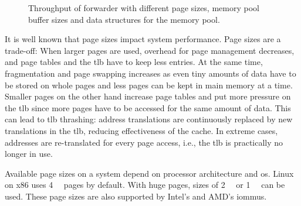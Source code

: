 \begin{figure}[!b]
    \centering
    \par
    \par

    \caption{Throughput of forwarder with different page sizes, memory pool
    buffer sizes and data structures for the memory pool.}
    \label{fig:page-size-throughput}
\end{figure}

It is well known that page sizes impact system performance. Page sizes are a
trade-off: When larger pages are used, overhead for page management decreases,
and page tables and the \ac{tlb} have to keep less entries. At the same time,
fragmentation and page swapping increases as even tiny amounts of data have to
be stored on whole pages and less pages can be kept in main memory at a time.
Smaller pages on the other hand increase page tables and put more pressure on
the \ac{tlb} since more pages have to be accessed for the same amount of data.
This can lead to \ac{tlb} thrashing: address translations are continuously
replaced by new translations in the \ac{tlb}, reducing effectiveness of the
cache. In extreme cases, addresses are re-translated for every page access,
i.e., the \ac{tlb} is practically no longer in use.

Available page sizes on a system depend on processor architecture and \ac{os}.
Linux on x86 uses \SI{4}{\kibi\byte} pages by default. With huge pages, sizes of
\SI{2}{\mebi\byte} or \SI{1}{\gibi\byte} can be used. These page sizes are also
supported by Intel's and AMD's \acp{iommu}.

